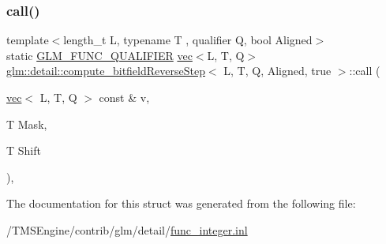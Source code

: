 \subsubsection{\texorpdfstring{call()}{call()}}
{\footnotesize\ttfamily template$<$length\+\_\+t L, typename T , qualifier Q, bool Aligned$>$ \\
static \hyperlink{setup_8hpp_a33fdea6f91c5f834105f7415e2a64407}{G\+L\+M\+\_\+\+F\+U\+N\+C\+\_\+\+Q\+U\+A\+L\+I\+F\+I\+ER} \hyperlink{structglm_1_1vec}{vec}$<$L, T, Q$>$ \hyperlink{structglm_1_1detail_1_1compute__bitfield_reverse_step}{glm\+::detail\+::compute\+\_\+bitfield\+Reverse\+Step}$<$ L, T, Q, Aligned, true $>$\+::call (\begin{DoxyParamCaption}\item[{\hyperlink{structglm_1_1vec}{vec}$<$ L, T, Q $>$ const \&}]{v,  }\item[{T}]{Mask,  }\item[{T}]{Shift }\end{DoxyParamCaption})\hspace{0.3cm}{\ttfamily [inline]}, {\ttfamily [static]}}



The documentation for this struct was generated from the following file\+:\begin{DoxyCompactItemize}
\item 
/\+T\+M\+S\+Engine/contrib/glm/detail/\hyperlink{func__integer_8inl}{func\+\_\+integer.\+inl}\end{DoxyCompactItemize}
